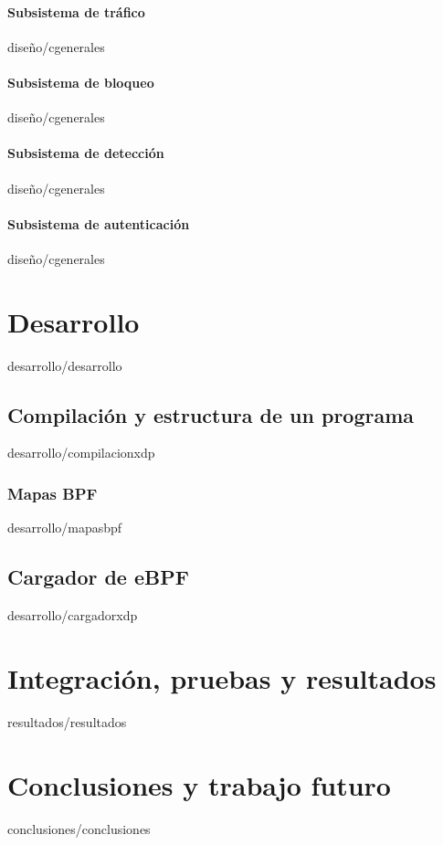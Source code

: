 \documentclass[epsbased,copyright,final,printable,covers,extendedindex,firstnumbered,tfg,gnuplot]{tfgtfmthesisuam}
\begin{document}
            \subsubsection{Subsistema de tráfico\label{SEC:CARGADORXDP}}{diseño/cgenerales}
            \subsubsection{Subsistema de bloqueo\label{SEC:CARGADORXDP}}{diseño/cgenerales}
            \subsubsection{Subsistema de detección\label{SEC:CARGADORXDP}}{diseño/cgenerales}
            \subsubsection{Subsistema de autenticación\label{SEC:CARGADORXDP}}{diseño/cgenerales}


\chapter{Desarrollo\label{CAP:DESARROLLO}}{desarrollo/desarrollo}
    \section{Compilación y estructura de un programa\label{SEC:COMPILACIONXDP}}{desarrollo/compilacionxdp}
        \subsection{Mapas BPF\label{SEC:MAPASBPF}}{desarrollo/mapasbpf}
    \section{Cargador de eBPF\label{SEC:CARGADORXDP}}{desarrollo/cargadorxdp}
    



\chapter{Integración, pruebas y resultados\label{CAP:RESULTADOS}}{resultados/resultados}


\chapter{Conclusiones y trabajo futuro\label{CAP:CONCLUSIONES}}{conclusiones/conclusiones}
\end{document}
